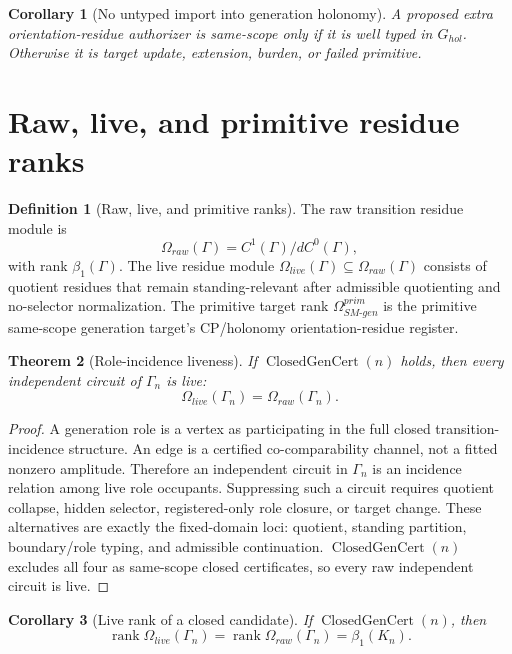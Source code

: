 \documentclass[11pt]{article}
\newcommand{\ClosedGenCert}{\operatorname{ClosedGenCert}}
\newcommand{\rank}{\operatorname{rank}}
\theoremstyle{definition}
\newtheorem{definition}{Definition}[section]
\theoremstyle{plain}
\newtheorem{theorem}{Theorem}[section]
\newtheorem{corollary}[theorem]{Corollary}
\theoremstyle{remark}
\begin{document}
\begin{corollary}[No untyped import into generation holonomy]
A proposed extra orientation-residue authorizer is same-scope only if it is well typed in \(G_{hol}\). Otherwise it is target update, extension, burden, or failed primitive.
\end{corollary}

\section{Raw, live, and primitive residue ranks}

\begin{definition}[Raw, live, and primitive ranks]
The raw transition residue module is
\[
\Omega_{raw}(\Gamma)=C^1(\Gamma)/dC^0(\Gamma),
\]
with rank \(\beta_1(\Gamma)\). The live residue module \(\Omega_{live}(\Gamma)\subseteq\Omega_{raw}(\Gamma)\) consists of quotient residues that remain standing-relevant after admissible quotienting and no-selector normalization. The primitive target rank \(\Omega_{SM\text{-}gen}^{prim}\) is the primitive same-scope generation target's CP/holonomy orientation-residue register.
\end{definition}

\begin{theorem}[Role-incidence liveness]
If \(\ClosedGenCert(n)\) holds, then every independent circuit of \(\Gamma_n\) is live:
\[
\Omega_{live}(\Gamma_n)=\Omega_{raw}(\Gamma_n).
\]
\end{theorem}
\begin{proof}
A generation role is a vertex as participating in the full closed transition-incidence structure. An edge is a certified co-comparability channel, not a fitted nonzero amplitude. Therefore an independent circuit in \(\Gamma_n\) is an incidence relation among live role occupants. Suppressing such a circuit requires quotient collapse, hidden selector, registered-only role closure, or target change. These alternatives are exactly the fixed-domain loci: quotient, standing partition, boundary/role typing, and admissible continuation. \(\ClosedGenCert(n)\) excludes all four as same-scope closed certificates, so every raw independent circuit is live.
\end{proof}

\begin{corollary}[Live rank of a closed candidate]
If \(\ClosedGenCert(n)\), then
\[
\rank\Omega_{live}(\Gamma_n)=\rank\Omega_{raw}(\Gamma_n)=\beta_1(K_n).
\]
\end{corollary}
\end{document}
